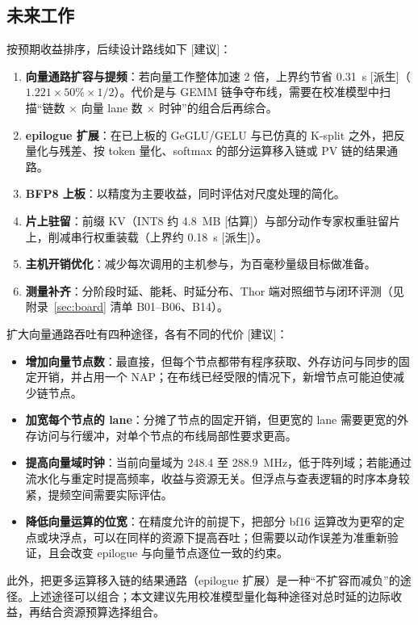 \documentclass[a4paper,10.5pt]{ctexart}
\newcommand{\tD}{\textsf{[派生]}}           %
\newcommand{\tE}{\textsf{[估算]}}           %
\newcommand{\tR}{\textsf{[建议]}}           %
\begin{document}
\subsection{未来工作}

按预期收益排序，后续设计路线如下 \tR：
\begin{enumerate}
  \item \textbf{向量通路扩容与提频}：若向量工作整体加速 2 倍，上界约节省 0.31~s \tD（$1.221\times50\%\times1/2$）。代价是与 GEMM 链争夺布线，需要在校准模型中扫描“链数 $\times$ 向量 lane 数 $\times$ 时钟”的组合后再综合。
  \item \textbf{epilogue 扩展}：在已上板的 GeGLU/GELU 与已仿真的 K-split 之外，把反量化与残差、按 token 量化、softmax 的部分运算移入链或 PV 链的结果通路。
  \item \textbf{BFP8 上板}：以精度为主要收益，同时评估对尺度处理的简化。
  \item \textbf{片上驻留}：前缀 KV（INT8 约 4.8~MB \tE）与部分动作专家权重驻留片上，削减串行权重装载（上界约 0.18~s \tD）。
  \item \textbf{主机开销优化}：减少每次调用的主机参与，为百毫秒量级目标做准备。
  \item \textbf{测量补齐}：分阶段时延、能耗、时延分布、Thor 端对照细节与闭环评测（见附录~\ref{sec:board} 清单 B01--B06、B14）。
\end{enumerate}

扩大向量通路吞吐有四种途径，各有不同的代价 \tR：
\begin{itemize}
  \item \textbf{增加向量节点数}：最直接，但每个节点都带有程序获取、外存访问与同步的固定开销，并占用一个 NAP；在布线已经受限的情况下，新增节点可能迫使减少链节点。
  \item \textbf{加宽每个节点的 lane}：分摊了节点的固定开销，但更宽的 lane 需要更宽的外存访问与行缓冲，对单个节点的布线局部性要求更高。
  \item \textbf{提高向量域时钟}：当前向量域为 248.4 至 288.9~MHz，低于阵列域；若能通过流水化与重定时提高频率，收益与资源无关。但浮点与查表逻辑的时序本身较紧，提频空间需要实际评估。
  \item \textbf{降低向量运算的位宽}：在精度允许的前提下，把部分 bf16 运算改为更窄的定点或块浮点，可以在同样的资源下提高吞吐；但需要以动作误差为准重新验证，且会改变 epilogue 与向量节点逐位一致的约束。
\end{itemize}
此外，把更多运算移入链的结果通路（epilogue 扩展）是一种“不扩容而减负”的途径。上述途径可以组合；本文建议先用校准模型量化每种途径对总时延的边际收益，再结合资源预算选择组合。
\end{document}
